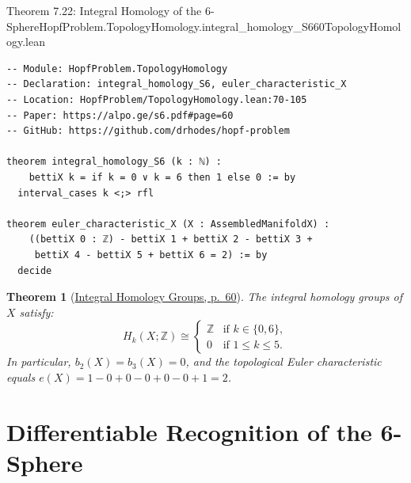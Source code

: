\documentclass[10pt]{article}
\newtheorem{theorem}{Theorem}[section]
\newcommand{\dbZ}{\mathbb{Z}}
\gdef\hashchar{#}
\newcommand{\paperref}[2]{\href{https://alpo.ge/s6.pdf\hashchar page=#1}{#2}}
\begin{document}
\begin{comparativeblock}{Theorem 7.22: Integral Homology of the 6-Sphere}{HopfProblem.TopologyHomology.integral_homology_S6}{60}{TopologyHomology.lean}
\begin{verbatim}
-- Module: HopfProblem.TopologyHomology
-- Declaration: integral_homology_S6, euler_characteristic_X
-- Location: HopfProblem/TopologyHomology.lean:70-105
-- Paper: https://alpo.ge/s6.pdf#page=60
-- GitHub: https://github.com/drhodes/hopf-problem

theorem integral_homology_S6 (k : ℕ) :
    bettiX k = if k = 0 ∨ k = 6 then 1 else 0 := by
  interval_cases k <;> rfl

theorem euler_characteristic_X (X : AssembledManifoldX) :
    ((bettiX 0 : ℤ) - bettiX 1 + bettiX 2 - bettiX 3 +
     bettiX 4 - bettiX 5 + bettiX 6 = 2) := by
  decide
\end{verbatim}
\tcblower
\begin{theorem}[\paperref{60}{Integral Homology Groups, p.~60}]\label{thm:homology-S6}
The integral homology groups of $X$ satisfy:
\[
H_k(X; \dbZ) \cong \begin{cases} \dbZ & \text{if } k \in \{0, 6\}, \\ 0 & \text{if } 1 \le k \le 5. \end{cases}
\]
In particular, $b_2(X) = b_3(X) = 0$, and the topological Euler characteristic equals $e(X) = 1 - 0 + 0 - 0 + 0 - 0 + 1 = 2$.
\end{theorem}
\end{comparativeblock}

\newpage

\section{Differentiable Recognition of the 6-Sphere}
\end{document}
